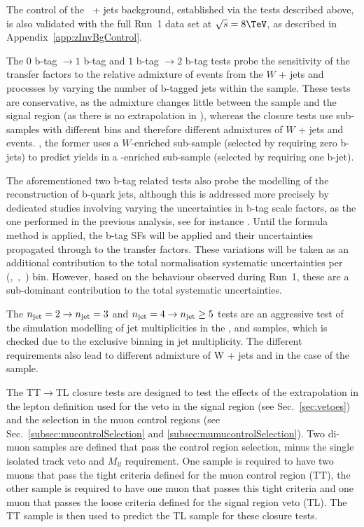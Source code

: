 The control of the \znunu\ + jets background, established via the
tests described above, is also validated with the full Run~1 data set
at $\sqrt{s} = 8\tev$, as described in
Appendix~\ref{app:zInvBgControl}.

The $0$ b-tag $\rightarrow1$ b-tag and $1$ b-tag $\rightarrow2$ b-tag
tests probe the sensitivity of the transfer factors to the relative
admixture of events from the $W$ + jets and \ttbar processes by
varying the number of b-tagged jets within the \mj sample. These tests
are conservative, as the admixture changes little between the \mj
sample and the signal region (as there is no extrapolation in \nb),
whereas the closure tests use sub-samples with different \nb bins and
therefore different admixtures of $W$ + jets and \ttbar events. \eg,
the former uses a $W$-enriched sub-sample (selected by requiring zero
b-jets) to predict yields in a \ttbar-enriched sub-sample (selected by
requiring one b-jet).

The aforementioned two b-tag related tests also probe the modelling of
the reconstruction of b-quark jets, although this is addressed more
precisely by dedicated studies involving varying the uncertainties in
b-tag scale factors, as the one performed in the previous analysis,
see for instance \cite{CMS_AN_2013-366}. Until the formula method is
applied, the b-tag SFs will be applied and their uncertainties
propagated through to the transfer factors. These variations will be
taken as an additional contribution to the total normalisation
systematic uncertainties per (\njet,~\nb,~\scalht) bin. However, based
on the behaviour observed during Run~1, these are a sub-dominant
contribution to the total systematic uncertainties.

The $\njet=2\rightarrow\njet=3$ and $\njet=4\rightarrow\njet\geq5$
tests are an aggressive test of the simulation modelling of jet
multiplicities in the \mj, \mmj and \gj samples, which is checked due
to the exclusive binning in jet multiplicity. The different \njet
requirements also lead to different admixture of W + jets and \ttbar
in the case of the \mj sample.

The TT$\rightarrow$TL closure tests are designed to test the effects
of the extrapolation in the lepton definition used for the veto in the
signal region (see Sec.~\ref{sec:vetoes}) and the selection in the
muon control regions (see Sec.~\ref{subsec:mucontrolSelection} and
\ref{subsec:mumucontrolSelection}). Two di-muon samples are defined
that pass the \mmj control region selection, minus the single isolated
track veto and $M_{ll}$ requirement. One sample is required to have
two muons that pass the tight criteria defined for the muon control
region (TT), the other sample is required to have one muon that passes
this tight criteria and one muon that passes the loose criteria
defined for the signal region veto (TL). The TT sample is then used to
predict the TL sample for these closure tests.

